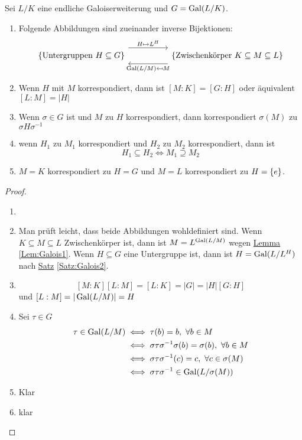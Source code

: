 \begin{Satz}[Galoiskorrespondenz]
Sei $L/K$ eine endliche Galoiserweiterung und $G=\operatorname{Gal}(L/K)$.
\begin{enumerate}
    \item Folgende Abbildungen sind zueinander inverse Bijektionen:
$$%
\begin{tikzcd}
\Set{\text{Untergruppen $H\subseteq G$}} \arrow[rr, "H\mapsto L^H", shift left=4] &  & \Set{\text{Zwischenkörper $K\subseteq M\subseteq L$}} \arrow[ll, "\Gal(L/M)\mapsfrom M", shift left=4]
\end{tikzcd}$$
\item Wenn $H$ mit $M$ korrespondiert, dann ist $[M:K]=[G:H]$ oder äquivalent $[L:M]=|H|$
\item Wenn $\sigma\in G$ ist und $M$ zu $H$ korrespondiert, dann korrespondiert $\sigma(M)$ zu $\sigma H\sigma^{-1}$
\item wenn $H_1$ zu $M_1$ korrespondiert und $H_2$ zu $M_2$ korrespondiert, dann ist $$H_1\subseteq H_2\iff M_1\supseteq M_2$$
\item $M=K$ korrespondiert zu $H=G$ und $M=L$ korrespondiert zu $H=\{e\}$.
\end{enumerate}
\begin{proof}
    \begin{enumerate}
        \item[] 
        \item Man prüft leicht, dass beide Abbildungen wohldefiniert sind.
        Wenn $K\subseteq M\subseteq L$ Zwischenkörper ist, dann ist $M=L^{\operatorname{Gal}(L/M)}$ wegen \hyperref[Lem:Galois1]{Lemma} \ref{Lem:Galois1}.
        Wenn $H\subseteq G$ eine Untergruppe ist, dann ist $H=\operatorname{Gal}(L/L^H)$ nach \hyperref[Satz:Galois2]{Satz} \ref{Satz:Galois2}.
        \item $$[M:K][L:M]=[L:K]=|G|=|H|[G:H]$$ und $[L:M]=|\operatorname{Gal}(L/M)|=H$
        \item Sei $\tau\in G$
        \begin{align*}
            \tau\in \operatorname{Gal}(L/M)&\iff \tau(b)=b,\ \forall b\in M\\
            &\iff \sigma \tau\sigma^{-1}\sigma(b)=\sigma(b),\ \forall b\in M\\
            &\iff \sigma\tau\sigma^{-1}(c)=c,\ \forall c\in \sigma(M)\\
            & \iff \sigma\tau\sigma^{-1}\in\operatorname{Gal}(L/\sigma(M))
        \end{align*}
        \item Klar
        \item klar
    \end{enumerate}
\end{proof}

\end{Satz}
